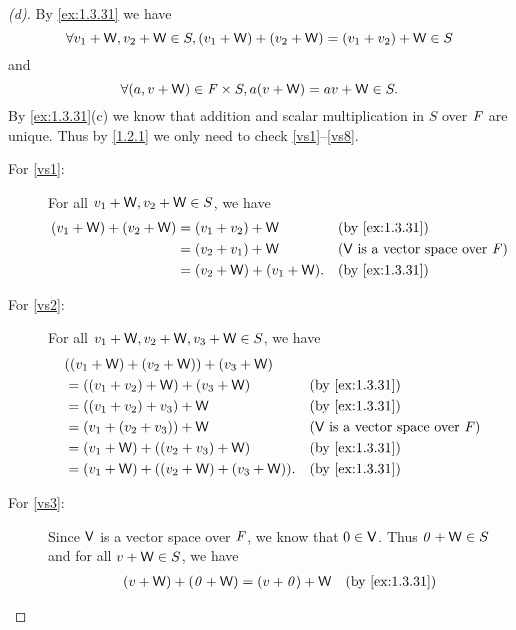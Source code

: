 \begin{proof}[(d)]
  By \cref{ex:1.3.31} we have
  \[
    \forall v_1 + \mathsf{W}, v_2 + \mathsf{W} \in S, (v_1 + \mathsf{W}) + (v_2 + \mathsf{W}) = (v_1 + v_2) + \mathsf{W} \in S
  \]
  and
  \[
    \forall (a, v + \mathsf{W}) \in \mathit{F} \times S, a(v + \mathsf{W}) = av + \mathsf{W} \in S.
  \]
  By \cref{ex:1.3.31}(c) we know that addition and scalar multiplication in \(S\) over \(\mathit{F}\) are unique.
  Thus by \cref{1.2.1} we only need to check \ref{vs1}--\ref{vs8}.
  \begin{description}
    \item[For \ref{vs1}:]
      For all \(v_1 + \mathsf{W}, v_2 + \mathsf{W} \in S\), we have
      \begin{align*}
        (v_1 + \W) + (v_2 + \W) & = (v_1 + v_2) + \W         &  & \by{ex:1.3.31}                                \\
                                & = (v_2 + v_1) + \W         &  & \text{(\(\V\) is a vector space over \(\F\))} \\
                                & = (v_2 + \W) + (v_1 + \W). &  & \by{ex:1.3.31}
      \end{align*}
    \item[For \ref{vs2}:]
      For all \(v_1 + \mathsf{W}, v_2 + \mathsf{W}, v_3 + \mathsf{W} \in S\), we have
      \begin{align*}
         & ((v_1 + \W) + (v_2 + \W)) + (v_3 + \W)                                                       \\
         & = ((v_1 + v_2) + \W) + (v_3 + \W)         &  & \by{ex:1.3.31}                                \\
         & = ((v_1 + v_2) + v_3) + \W                &  & \by{ex:1.3.31}                                \\
         & = (v_1 + (v_2 + v_3)) + \W                &  & \text{(\(\V\) is a vector space over \(\F\))} \\
         & = (v_1 + \W) + ((v_2 + v_3) + \W)         &  & \by{ex:1.3.31}                                \\
         & = (v_1 + \W) + ((v_2 + \W) + (v_3 + \W)). &  & \by{ex:1.3.31}
      \end{align*}
    \item[For \ref{vs3}:]
      Since \(\mathsf{V}\) is a vector space over \(\mathit{F}\), we know that \(0 \in \mathsf{V}\).
      Thus \(\mathit{0} + \mathsf{W} \in S\) and for all \(v + \mathsf{W} \in S\), we have
      \begin{align*}
        (v + \W) + (\zv + \W) & = (v + \zv) + \W &  & \by{ex:1.3.31}                                \\

\end{align*}
\end{description}
\end{proof}
